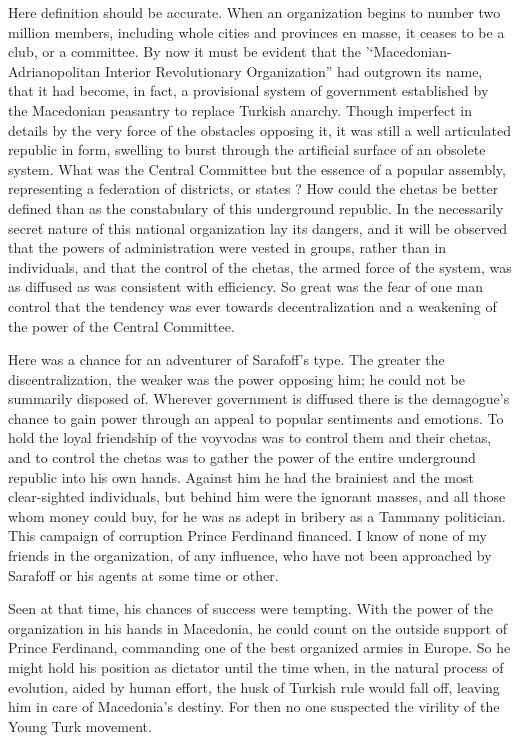\documentclass[a5paper,12pt]{book}
\begin{document}
Here definition should be accurate. When an organization begins to number two million members, including whole cities and provinces en masse, it ceases to be a club, or a committee. By now it must be evident that the '‘Macedonian-Adrianopolitan Interior Revolutionary Organization” had outgrown its name, that it had become, in fact, a provisional system of government established by the Macedonian peasantry to replace Turkish anarchy. Though imperfect in details by the very force of the obstacles opposing it, it was still a well articulated republic in form, swelling to burst through the artificial surface of an obsolete system. What was the Central Committee but the essence of a popular assembly, representing a federation of districts, or states ? How could the chetas be better defined than as the constabulary of this underground republic.
In the necessarily secret nature of this national organization lay its dangers, and it will be observed that the powers of administration were vested in groups, rather than in individuals, and that the control of the chetas, the armed force of the system, was as diffused as was consistent with efficiency. So great was the fear of one man control that the tendency was ever towards decentralization and a weakening of the power of the Central Committee.

Here was a chance for an adventurer of Sarafoff’s type. The greater the discentralization, the weaker was the power opposing him; he could not be summarily disposed of. Wherever government is diffused there is the demagogue’s chance to gain power through an appeal to popular sentiments and emotions. To hold the loyal friendship of the voyvodas was to control them and their chetas, and to control the chetas was to gather the power of the entire underground republic into his own hands. Against him he had the brainiest and the most clear-sighted individuals, but behind him were the ignorant masses, and all those whom money could buy, for he was as adept in bribery as a Tammany politician. This campaign of corruption Prince Ferdinand financed. I know of none of my friends in the organization, of any influence, who have not been approached by Sarafoff or his agents at some time or other.

Seen at that time, his chances of success were tempting. With the power of the organization in his hands in Macedonia, he could count on the outside support of Prince Ferdinand, commanding one of the best organized armies in Europe. So he might hold his position as dictator until the time when, in the natural process of evolution, aided by human effort, the husk of Turkish rule would fall off, leaving him in care of Macedonia's destiny. For then no one suspected the virility of the Young Turk movement.
\end{document}
